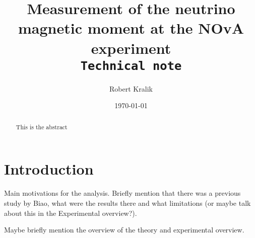 \documentclass[12pt]{article}
\title{Measurement of the neutrino magnetic moment at the NOvA experiment\\ \vspace*{1cm} \texttt{Technical note}}
\author[1]{Robert Kralik}
\affil[1]{University of Sussex, Brighton, UK}
\date{\today}
\begin{document}
\maketitle

\begin{abstract}
    This is the abstract
\end{abstract}
\newpage
\tableofcontents
\newpage

\section{Introduction}

Main motivations for the analysis. Briefly mention that there was a previous study by Biao, what were the results there and what limitations (or maybe talk about this in the Experimental overview?).

Maybe briefly mention the overview of the theory and experimental overview.


\end{document}
